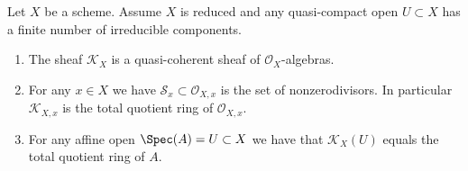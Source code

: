 \begin{lemma}
\label{lemma-reduced-finite-irreducible}
Let $X$ be a scheme.
Assume $X$ is reduced and any quasi-compact open $U \subset X$
has a finite number of irreducible components.
\begin{enumerate}
\item The sheaf $\mathcal{K}_X$ is a quasi-coherent sheaf of
$\mathcal{O}_X$-algebras.
\item For any $x \in X$ we have $\mathcal{S}_x \subset \mathcal{O}_{X, x}$
is the set of nonzerodivisors. In particular $\mathcal{K}_{X, x}$
is the total quotient ring of $\mathcal{O}_{X, x}$.
\item For any affine open $\Spec(A) = U \subset X$ we have
that $\mathcal{K}_X(U)$ equals the total quotient ring of $A$.
\end{enumerate}
\end{lemma}

